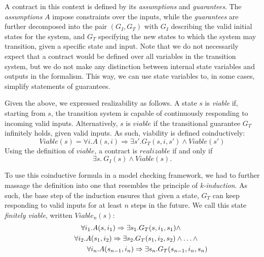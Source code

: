 A contract in this context is defined by its
\textit{assumptions} and \textit{guarantees}. The \textit{assumptions} $A$
impose constraints over the inputs, while the \textit{guarantees} are
further decomposed into the pair $(G_I,G_T)$ with $G_I$ describing the
valid initial states for the system, and $G_T$ specifying the new states to which
the system may transition, given a specific state and input. Note that
we do not necessarily
expect that a contract would be defined over all variables in the
transition system,
but we do not make any distinction between internal state variables
and outputs in the formalism.  This way, we can use state variables to, in some cases, simplify statements of guarantees.

Given the above, we expressed realizability as follows. A state $s$ is
\textit{viable} if, starting from $s$, the transition system is capable of continuously responding to
incoming valid inputs. Alternatively, $s$ is $viable$ if the transitional
guarantee $G_T$ infinitely holds, given valid inputs. As such,
viability is defined coinductively:
\begin{equation}
\label{eq:viable}
Viable(s) = \forall i. A(s,i) \Rightarrow \exists s'. G_{T}(s,i,s') \wedge
Viable(s')
\end{equation}
Using the definition of $viable$, a
contract is $realizable$ if and only if
\begin{equation}
\label{eq:realizable}
 \exists s.~ G_I(s) \land Viable(s).
\end{equation}

To use this coinductive formula in a model checking framework, we had to further
massage the definition into one that resembles the principle of
\textit{k-induction}. As such, the base step of the induction ensures that
given a state, $G_T$ can keep responding to valid inputs for at least $n$ steps
in the future. We call this state \textit{finitely viable}, written
$Viable_{n}(s)$:
\begin{multline}
\label{ml:fv}
		\forall i_1. A(s,i_1) \Rightarrow \exists s_1. G_T(s,i_1,s_1) \wedge~ \\
			\hspace{+0.5cm} \forall i_2. A(s_1,i_2) \Rightarrow \exists s_2.
			 G_T(s_1,i_2,s_2) \wedge \ldots \wedge~ \\
			 \hspace{+1.5cm} \forall i_n. A(s_{n-1},i_n) \Rightarrow \exists s_n. G_T(s_{n-1},i_n,s_n)
	\end{multline}

